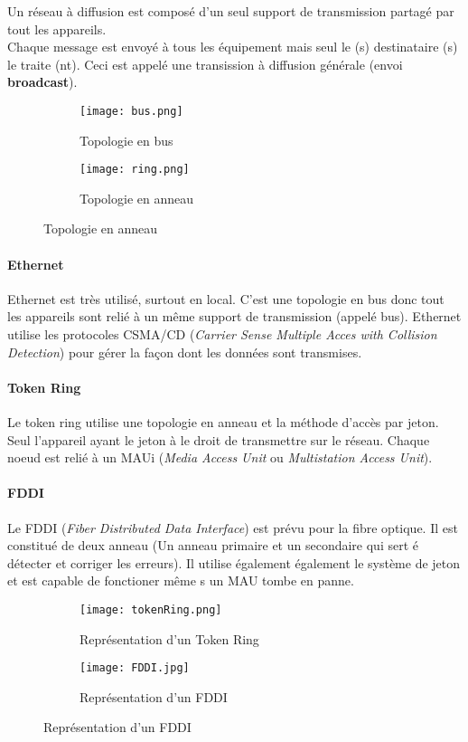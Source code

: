 \documentclass[10pt,a4paper]{article}
\begin{document}
 Un réseau à diffusion est composé d'un seul support de transmission partagé par tout les appareils.\\
 Chaque message est envoyé à tous les équipement mais seul le (s) destinataire (s) le traite (nt). Ceci est appelé une transission à diffusion générale (envoi \textbf{broadcast}).\\
 \begin{figure}[h]
	 \begin{subfigure}{.5\textwidth}
		 \centering
		 \texttt{[image: bus.png]}
	 	 \caption{Topologie en bus}
	 \end{subfigure}
	 \begin{subfigure}{.5\textwidth}
		 \centering
		 \texttt{[image: ring.png]}
		 \caption{Topologie en anneau}
	 \end{subfigure}
 \end{figure}
 \paragraph{Ethernet}\leavevmode

 \smallskip

 Ethernet est très utilisé, surtout en local. C'est une topologie en bus donc tout les appareils sont relié à un même support de transmission (appelé bus). Ethernet utilise les protocoles CSMA/CD (\textit{Carrier Sense Multiple Acces with Collision Detection}) pour gérer la façon dont les données sont transmises.

 \paragraph{Token Ring}\leavevmode

 \smallskip

 Le token ring utilise une topologie en anneau et la méthode d'accès par jeton. Seul l'appareil ayant le jeton à le droit de transmettre sur le réseau. Chaque noeud est relié à un MAUi (\textit{Media Access Unit} ou \textit{Multistation Access Unit})\@.

 \paragraph{FDDI}\leavevmode

 \smallskip

 Le FDDI (\textit{Fiber Distributed Data Interface}) est prévu pour la fibre optique. Il est constitué de deux anneau (Un anneau primaire et un secondaire qui sert é détecter et corriger les erreurs). Il utilise également également le système de jeton et est capable de fonctioner même s un MAU tombe en panne.
 \begin{figure}[h]
	 \begin{subfigure}{.5\textwidth}
		 \centering
		 \texttt{[image: tokenRing.png]}
		 \caption{Représentation d'un Token Ring}
	 \end{subfigure}
	 \begin{subfigure}{.5\textwidth}
		 \centering
		 \texttt{[image: FDDI.jpg]}
		 \caption{Représentation d'un FDDI}
	 \end{subfigure}
 \end{figure}
\end{document}
